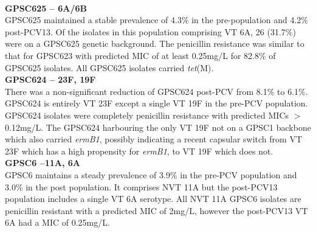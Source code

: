 \documentclass{article}
\begin{document}
\\\textbf{GPSC625 – 6A/6B }
\\GPSC625 maintained a stable prevalence of 4.3\% in the pre-population and 4.2\% post-PCV13. Of the isolates in this population comprising VT 6A, 26 (31.7\%) were on a GPSC625 genetic background. The penicillin resistance was similar to that for GPSC623 with predicted MIC of at least 0.25mg/L for 82.8\% of GPSC625 isolates. All GPSC625 isolates carried \textit{tet}(M). 
\\\textbf{GPSC624 – 23F, 19F}
\\There was a non-significant reduction of GPSC624 post-PCV from 8.1\% to 6.1\%. GPSC624 is entirely VT 23F except a single VT 19F in the pre-PCV population. GPSC624 isolates were completely penicillin resistance with predicted MICs $>$0.12mg/L. The GPSC624 harbouring the only VT 19F not on a GPSC1 backbone which also carried \textit{ermB1}, possibly indicating a recent capsular switch from VT 23F which has a high propensity for \textit{ermB1}, to VT 19F which does not.  
\\\textbf{GPSC6 –11A, 6A}
\\GPSC6 maintains a steady prevalence of 3.9\% in the pre-PCV population and 3.0\% in the post population. It comprises NVT 11A but the post-PCV13 population includes a single VT 6A serotype. All NVT 11A GPSC6 isolates are penicillin resistant with a predicted MIC of 2mg/L, however the post-PCV13 VT 6A had a MIC of 0.25mg/L. 
\end{document}
